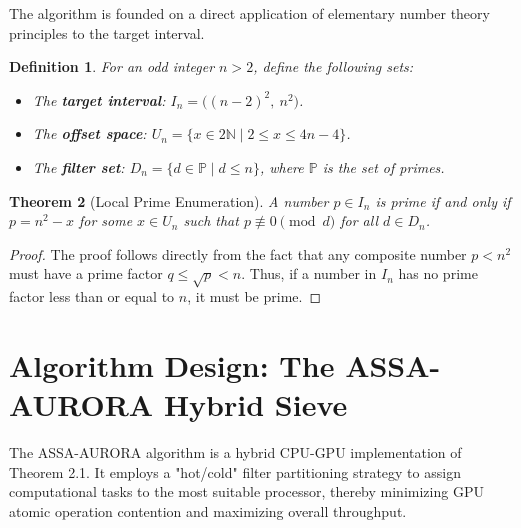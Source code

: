 \documentclass[11pt]{article}
\newtheorem{theorem}{Theorem}[section]
\newtheorem{definition}[theorem]{Definition}
\begin{document}
The algorithm is founded on a direct application of elementary number theory principles to the target interval.

\begin{definition}
For an odd integer $n > 2$, define the following sets:
\begin{itemize}[leftmargin=*, noitemsep]
    \item The \textbf{target interval}: $I_n = \big( (n-2)^2,\ n^2 \big)$.
    \item The \textbf{offset space}: $U_n = \{ x \in 2\mathbb{N} \mid 2 \leq x \leq 4n - 4 \}$.
    \item The \textbf{filter set}: $D_n = \{ d \in \mathbb{P} \mid d \leq n \}$, where $\mathbb{P}$ is the set of primes.
\end{itemize}
\end{definition}

\begin{theorem}[Local Prime Enumeration]
A number $p \in I_n$ is prime if and only if $p = n^2 - x$ for some $x \in U_n$ such that $p \not\equiv 0 \pmod{d}$ for all $d \in D_n$.
\end{theorem}
\begin{proof}
The proof follows directly from the fact that any composite number $p < n^2$ must have a prime factor $q \leq \sqrt{p} < n$. Thus, if a number in $I_n$ has no prime factor less than or equal to $n$, it must be prime.
\end{proof}

\section{Algorithm Design: The ASSA-AURORA Hybrid Sieve}

The ASSA-AURORA algorithm is a hybrid CPU-GPU implementation of Theorem 2.1. It employs a "hot/cold" filter partitioning strategy to assign computational tasks to the most suitable processor, thereby minimizing GPU atomic operation contention and maximizing overall throughput.
\end{document}
